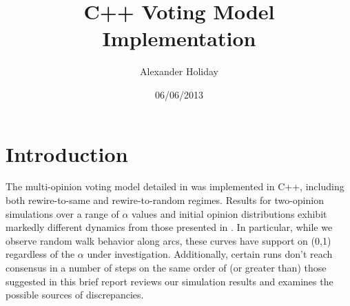 \documentclass[11pt]{article}
\begin{document}
\title{\vspace{-15ex}C++ Voting Model Implementation}
\author{Alexander Holiday\vspace{-2ex}}
\date{06/06/2013}
\maketitle
\section*{Introduction}
The multi-opinion voting model detailed in \cite{durret:pnas12} was implemented in C++, including both rewire-to-same and rewire-to-random regimes. Results for two-opinion simulations over a range of $\alpha$ values and initial opinion distributions exhibit markedly different dynamics from those presented in \cite{durret:pnas12}. In particular, while we observe random walk behavior along arcs, these curves have support on (0,1) regardless of the $\alpha$ under investigation. Additionally, certain runs don't reach consensus in a number of steps on the same order of (or greater than) those suggested in \cite{durret:pnas12} this brief report reviews our simulation results and examines the possible sources of discrepancies.
\end{document}

